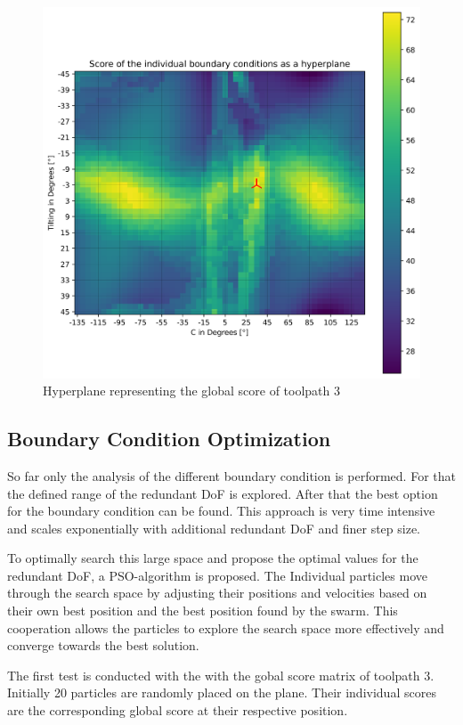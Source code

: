 \begin{figure}[H]
	\centerline{\includegraphics[width=1\textwidth]{figures/best_2D_3.png}}
	\caption{Hyperplane representing the global score of toolpath 3}
	\label{best_2D}
\end{figure}

\newpage
\subsection{Boundary Condition Optimization }
So far only the analysis of the different boundary condition is performed. For that the defined range of the redundant DoF is explored. After that the best option for the boundary condition can be found. This approach is very time intensive and scales exponentially with additional redundant DoF and finer step size.  

To optimally search this large space and propose the optimal values for the redundant DoF, a PSO-algorithm is proposed. The Individual particles move through the search space by adjusting their positions and velocities based on their own best position and the best position found by the swarm. This cooperation allows the particles to explore the search space more effectively and converge towards the best solution.

The first test is conducted with the with the gobal score matrix of toolpath 3. Initially 20 particles are randomly placed on the plane. Their individual scores are the corresponding global score at their respective position.

